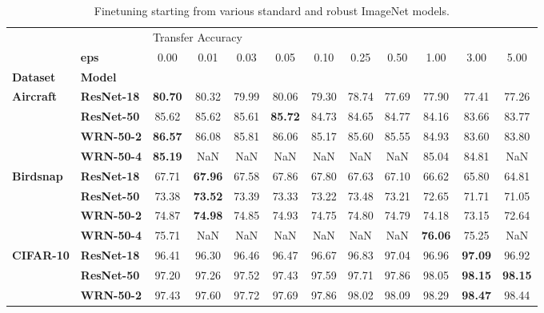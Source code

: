 \begin{table}
\centering
\caption{Finetuning starting from various standard and robust ImageNet models.}
\label{app:small-datasets-Finetuning}
\begin{tabular}{l|l|cccccccccc}
\toprule
       & {} & \multicolumn{10}{l}{Transfer Accuracy} \\
       & \textbf{eps} &              0.00 &  0.01 &  0.03 &  0.05 &  0.10 &  0.25 &  0.50 &  1.00 &  3.00 &  5.00 \\
\textbf{Dataset} & \textbf{Model} &                   &       &       &       &       &       &       &       &       &       \\
\midrule
\multirow{4}{*}{\textbf{Aircraft}} & \textbf{ResNet-18} &             \textbf{80.70} & 80.32 & 79.99 & 80.06 & 79.30 & 78.74 & 77.69 & 77.90 & 77.41 & 77.26 \\
       & \textbf{ResNet-50} &             85.62 & 85.62 & 85.61 & \textbf{85.72} & 84.73 & 84.65 & 84.77 & 84.16 & 83.66 & 83.77 \\
       & \textbf{WRN-50-2} &             \textbf{86.57} & 86.08 & 85.81 & 86.06 & 85.17 & 85.60 & 85.55 & 84.93 & 83.60 & 83.80 \\
       & \textbf{WRN-50-4} &             \textbf{85.19} &   NaN &   NaN &   NaN &   NaN &   NaN &   NaN & 85.04 & 84.81 &   NaN \\
\cline{1-12}
\multirow{4}{*}{\textbf{Birdsnap}} & \textbf{ResNet-18} &             67.71 & \textbf{67.96} & 67.58 & 67.86 & 67.80 & 67.63 & 67.10 & 66.62 & 65.80 & 64.81 \\
       & \textbf{ResNet-50} &             73.38 & \textbf{73.52} & 73.39 & 73.33 & 73.22 & 73.48 & 73.21 & 72.65 & 71.71 & 71.05 \\
       & \textbf{WRN-50-2} &             74.87 & \textbf{74.98} & 74.85 & 74.93 & 74.75 & 74.80 & 74.79 & 74.18 & 73.15 & 72.64 \\
       & \textbf{WRN-50-4} &             75.71 &   NaN &   NaN &   NaN &   NaN &   NaN &   NaN & \textbf{76.06} & 75.25 &   NaN \\
\cline{1-12}
\multirow{4}{*}{\textbf{CIFAR-10}} & \textbf{ResNet-18} &             96.41 & 96.30 & 96.46 & 96.47 & 96.67 & 96.83 & 97.04 & 96.96 & \textbf{97.09} & 96.92 \\
       & \textbf{ResNet-50} &             97.20 & 97.26 & 97.52 & 97.43 & 97.59 & 97.71 & 97.86 & 98.05 & \textbf{98.15} & \textbf{98.15} \\
       & \textbf{WRN-50-2} &             97.43 & 97.60 & 97.72 & 97.69 & 97.86 & 98.02 & 98.09 & 98.29 & \textbf{98.47} & 98.44 \\

\end{tabular}
\end{table}
